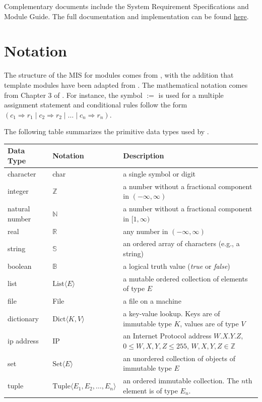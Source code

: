 \documentclass[12pt, titlepage]{article}
\begin{document}
Complementary documents include the System Requirement Specifications
and Module Guide. The full documentation and implementation can be
found \href{https://github.com/JackEaston4/Troitsky-Toolbox}{here}.

\section{Notation}

The structure of the MIS for modules comes from \citet{HoffmanAndStrooper1995},
with the addition that template modules have been adapted from
\citet{GhezziEtAl2003}. The mathematical notation comes from Chapter 3 of
\citet{HoffmanAndStrooper1995}. For instance, the symbol $:=$ is used for a
multiple assignment statement and conditional rules follow the form $(c_1
\Rightarrow r_1 \mid c_2 \Rightarrow r_2 \mid \dots \mid c_n \Rightarrow r_n )$.

The following table summarizes the primitive data types used by \progname.

\begin{center}
\renewcommand{\arraystretch}{1.25}
\begin{tabularx}{\textwidth}{l l X}
\toprule
\textbf{Data Type} & \textbf{Notation} & \textbf{Description} \\
\midrule
character & char & a single symbol or digit \\
integer & $\mathbb{Z}$ & a number without a fractional component in $(-\infty, \infty)$ \\
natural number & $\mathbb{N}$ & a number without a fractional component in $[1, \infty)$ \\
real & $\mathbb{R}$ & any number in $(-\infty, \infty)$ \\
string & $\mathbb{S}$ & an ordered array of characters (e.g., a string) \\
boolean & $\mathbb{B}$ & a logical truth value (\textit{true} or \textit{false}) \\
list & $\text{List}\langle E \rangle$ & a mutable ordered collection of elements of type $E$ \\
file & File & a file on a machine \\
dictionary & $\text{Dict}\langle K, V \rangle$ & a key-value lookup. Keys are of immutable type $K$, values are of type $V$ \\
ip address & IP & an Internet Protocol address $W.X.Y.Z$, $0 \le W,X,Y,Z \le 255$, $W,X,Y,Z \in \mathbb{Z}$ \\
set & $\text{Set}\langle E \rangle$ & an unordered collection of objects of immutable type $E$ \\
tuple & $\text{Tuple}\langle E_1, E_2, \dots, E_n \rangle$ & an ordered immutable collection. The $n$th element is of type $E_n$. \\
\bottomrule
\end{tabularx}
\end{center}
\end{document}
